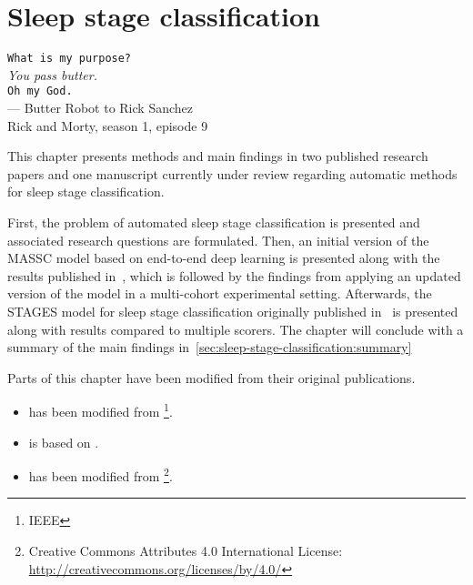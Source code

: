 \chapter{Sleep stage classification}\label{chap:sleep-stage-classification}
\begin{flushright}{
        \texttt{What is my purpose?}\\{\slshape You pass butter.}\\\texttt{Oh my God.}} \\ \medskip
        --- Butter Robot to Rick Sanchez\\Rick and Morty, season 1, episode 9
\end{flushright}
\vspace{6cm}

This chapter presents methods and main findings in two published research papers and one manuscript currently under review regarding automatic methods for sleep stage classification.

First, the problem of automated sleep stage classification is presented and associated research questions are formulated. 
Then, an initial version of the \acf{MASSC} model based on end-to-end deep learning is presented along with the results published in~\cite{Olesen2018c}, which is followed by the findings from applying an updated version of the model in a multi-cohort experimental setting.
Afterwards, the \ac{STAGES} model for sleep stage classification originally published in~\cite{Stephansen2018} is presented along with results compared to multiple scorers.
The chapter will conclude with a summary of the main findings in~\cref{sec:sleep-stage-classification:summary}

Parts of this chapter have been modified from their original publications. 
\begin{itemize}
    \item {} has been modified from \newline {}\footnote{ IEEE}.
    \item {} is based on \newline {}.
    \item {} has been modified from \newline {}\footnote{Creative Commons Attributes 4.0 International License: \url{http://creativecommons.org/licenses/by/4.0/}}.
\end{itemize} 

